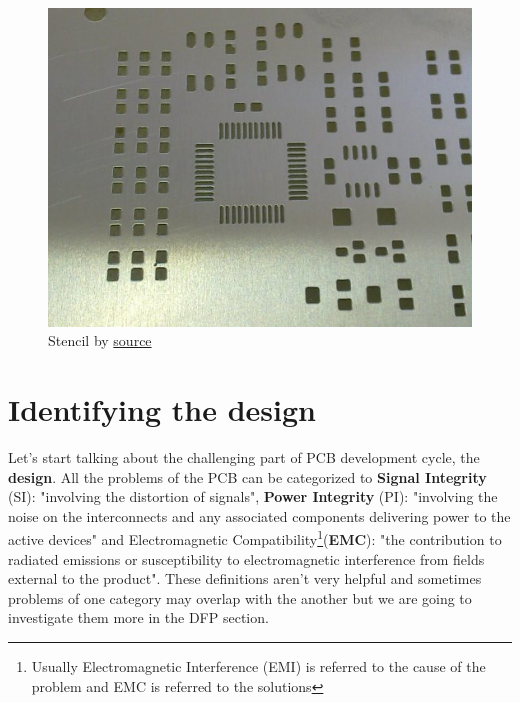 \documentclass[12pt]{article}
\begin{document}

\begin{figure}[h!]
	\centering
	\includegraphics[keepaspectratio, height = 0.25\textheight, width = \textwidth]{assets/solder_paste_stencil.jpg}
	\caption{Stencil by \href{https://www.itmconsulting.com/?product=stencilpro-3-0-stencil-aperture-calculator}{source}}
\end{figure}

\section{Identifying the design}


Let's start talking about the challenging part of PCB development cycle, the \textbf{design}. All the problems of the PCB can be categorized to \textbf{Signal Integrity} (SI): "involving the distortion of signals", \textbf{Power Integrity} (PI): "involving the noise on the interconnects and any associated components delivering power to the active devices" and Electromagnetic Compatibility\footnote{Usually Electromagnetic Interference (EMI) is referred to the cause of the problem and EMC is referred to the solutions}(\textbf{EMC}): "the contribution to radiated emissions or susceptibility to electromagnetic interference from fields external to the product". These definitions aren't very helpful and sometimes problems of one category may overlap with the another but we are going to investigate them more in the DFP section.
\end{document}

